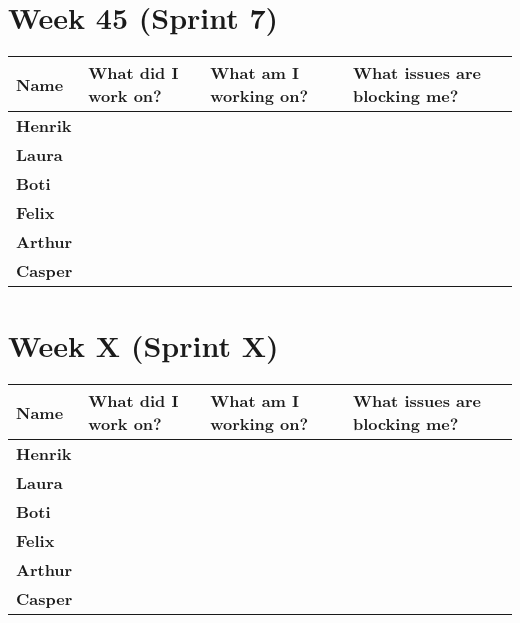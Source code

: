\documentclass[landscape]{article}
\begin{document}
    \section{Week 45 (Sprint 7)}
    \begin{table}[H]
        \begin{center}
            \begin{tabularx}{\linewidth}{L|L|L|L}
                
                \textbf{Name} & \textbf{What did I work on?} & \textbf{What am I working on? }& \textbf{What issues are blocking me?} \\
                \hline
                \textbf{Henrik} &  &  &  \\
                \hline
                \textbf{Laura} & & & \\
                \hline
                \textbf{Boti} & & & \\
                \hline
                \textbf{Felix} & & & \\
                \hline
                \textbf{Arthur} & & & \\
                \hline
                \textbf{Casper} &  &  & 
            \end{tabularx}
        \end{center}
    \end{table}

    \section{Week X (Sprint X)}
    \begin{table}[H]
        \begin{center}
            \begin{tabularx}{\linewidth}{L|L|L|L}
                
                \textbf{Name} & \textbf{What did I work on?} & \textbf{What am I working on? }& \textbf{What issues are blocking me?} \\
                \hline
                \textbf{Henrik} &  &  &  \\
                \hline
                \textbf{Laura} & & & \\
                \hline
                \textbf{Boti} & & & \\
                \hline
                \textbf{Felix} & & & \\
                \hline
                \textbf{Arthur} & & & \\
                \hline
                \textbf{Casper} &  &  & 
            \end{tabularx}
        \end{center}
    \end{table}
\end{document}
